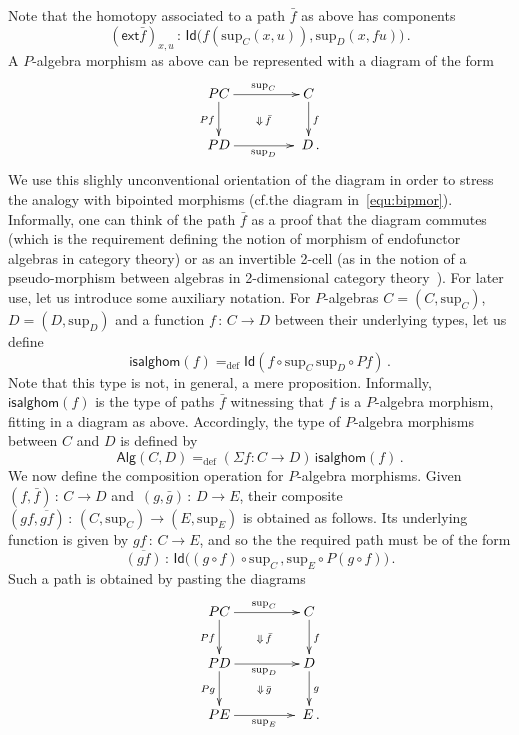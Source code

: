 \documentclass[10pt,a4paper,oneside,reqno]{amsart}
\numberwithin{equation}{section}
\theoremstyle{mythm}
\theoremstyle{mydef}
\theoremstyle{myrmk}
\newcommand{\defeq}{=_{\mathrm{def}}}
\newcommand{\co}{\,{:}\,}
\newcommand{\ext}{\mathsf{ext}}
\newcommand{\Id}{\mathsf{Id}}
\newcommand{\Palg}{\mathsf{Alg}}
\renewcommand{\sup}{\mathrm{sup}}
\begin{document}
Note that the homotopy associated to a path $\bar{f}$ as above has components
\[
(\ext \bar{f})_{x,u} \co \Id \big( f(\sup_C(x,u)), \sup_D(x, fu) \big) \, .
\]
A $P$-algebra morphism as above can be represented with a diagram of the form
\begin{equation*}
\vcenter{\hbox{\xymatrix@C=1.5cm{
 PC \ar[r]^{\sup_C} \ar[d]_{Pf}  \ar@{}[dr]|{\Downarrow \, \bar{f}} &  C \ar[d]^{f}\\
PD \ar[r]_{\sup_D}   & \; D \, .}}}
\end{equation*}
We use this slighly unconventional orientation of the diagram in order to stress the analogy with bipointed morphisms
({cf.\;}the diagram in~\eqref{equ:bipmor}).
Informally, one can think of the path $\bar{f}$ as a proof that the diagram commutes (which is the 
requirement defining the notion of morphism of endofunctor algebras in category theory) or as
an invertible 2-cell (as in the notion of a pseudo-morphism between algebras in 2-dimensional category 
theory~\cite{BlackwellR:twodmt}).  
For later use,  let us introduce some auxiliary notation. For $P$-algebras $C = (C, \sup_C)$, 
$D = (D, \sup_D)$ and a function $f \co C \to D$ between their underlying types, let us define
\begin{equation}
\label{equ:isalghom}
\mathsf{isalghom}(f) \defeq \Id( f \circ \sup_C \,  \sup_D \circ Pf) \, .
\end{equation}
Note that this type is not, in general, a mere proposition. 
Informally, $\mathsf{isalghom}(f)$ is the type of paths $\bar{f}$ witnessing that $f$ is a $P$-algebra morphism,
fitting in a diagram as above. Accordingly, the type of $P$-algebra 
morphisms between $C$ and $D$ is defined by
\[
\Palg(C,D)
 \defeq  
(\Sigma f:  C \rightarrow D) \, \mathsf{isalghom}(f) \, .
\]
We now define the composition operation for $P$-algebra morphisms. Given  $(f, \bar{f}) \co C \to D$ and~$(g, \bar{g}) \co D \to E$,
their composite $(gf, \overline{gf}) \co (C, \sup_C) \to (E, \sup_E)$
is obtained as follows. Its underlying function is given by $gf\co C \to E$, and so the 
the required path must be of the form
\[
 \overline{(g  f)} \co \Id\big( (g \circ f) \circ \sup_C   \, ,  \sup_E \circ P(g \circ f)  \big)\, .
\]
Such a path is obtained by pasting the diagrams 
\[
\xymatrix@C=1.5cm{
 PC \ar[r]^{\sup_C} \ar[d]_{Pf}  \ar@{}[dr]|{\Downarrow \, \bar{f}} &  C \ar[d]^{f}\\
PD \ar[r]_{\sup_D}  \ar[d]_{Pg}   \ar@{}[dr]|{\Downarrow \, \bar{g}} & D \ar[d]^g  \\
PE \ar[r]_{\sup_E} & \; E  \, .}
\] 
\end{document}
